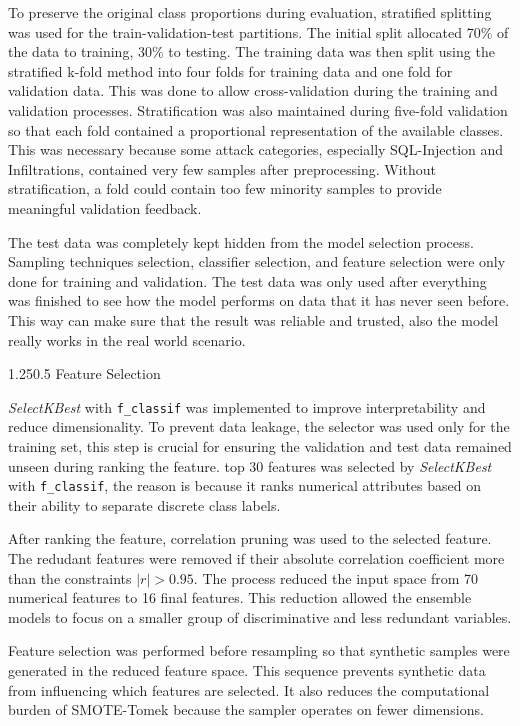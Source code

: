 \documentclass[12pt,a4paper]{article}
\makeatletter
\renewcommand{\subsection}{\@startsection{subsection}{2}{0pt}%
  {1.25\baselineskip}{0.5\baselineskip}%
  {\normalfont\fontsize{13}{15.6}\selectfont\bfseries}}
\makeatother
\begin{document}
To preserve the original class proportions during evaluation, stratified splitting was used for the train-validation-test partitions. The initial split allocated 70\% of the data to training, 30\% to testing. The training data was then split using the stratified k-fold method into four folds for training data and one fold for validation data. This was done to allow cross-validation during the training and validation processes. Stratification was also maintained during five-fold validation so that each fold contained a proportional representation of the available classes. This was necessary because some attack categories, especially SQL-Injection and Infiltrations, contained very few samples after preprocessing. Without stratification, a fold could contain too few minority samples to provide meaningful validation feedback.

The test data was completely kept hidden from the model selection process. Sampling techniques selection, classifier selection, and feature selection were only done for training and validation. The test data was only used after everything was finished to see how the model performs on data that it has never seen before. This way can make sure that the result was reliable and trusted, also the model really works in the real world scenario.

\subsection{Feature Selection}

\textit{SelectKBest} with \texttt{f\_classif} was implemented to improve interpretability and reduce dimensionality. To prevent data leakage, the selector was used only for the training set, this step is crucial for ensuring the validation and test data remained unseen during ranking the feature. top 30 features was selected by \textit{SelectKBest} with \texttt{f\_classif}, the reason is because it ranks numerical attributes based on their ability to separate discrete class labels. 

After ranking the feature, correlation pruning was used to the selected feature. The redudant features were removed if their absolute correlation coefficient more than the constraints \(|r| > 0.95\). The process reduced the input space from 70 numerical features to 16 final features. This reduction allowed the ensemble models to focus on a smaller group of discriminative and less redundant variables.

Feature selection was performed before resampling so that synthetic samples were generated in the reduced feature space. This sequence prevents synthetic data from influencing which features are selected. It also reduces the computational burden of SMOTE-Tomek because the sampler operates on fewer dimensions.
\end{document}
